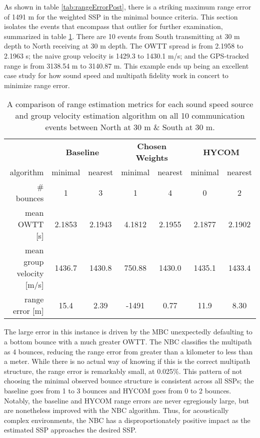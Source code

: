 As shown in table \ref{tab:rangeErrorPost}, there is a striking maximum range error of 1491 m for the weighted SSP in the minimal bounce criteria.
This section isolates the events that encompass that outlier for further examination, summarized in table \ref{tab:rangeErrorPostExplanation}.
There are 10 events from South transmitting at 30 m depth to North receiving at 30 m depth.
The OWTT spread is from 2.1958 to 2.1963 s; the naive group velocity is 1429.3 to 1430.1 m/s; and the GPS-tracked range is from 3138.54 m to 3140.87 m.
This example ends up being an excellent case study for how sound speed and multipath fidelity work in concert to minimize range error.

\begin{table}[h!]
\renewcommand{\arraystretch}{1.5}
\centering
\begin{tabular}{r|cc|cc|cc}\toprule
 & \multicolumn{2}{c|}{\textbf{Baseline} } & \multicolumn{2}{c|}{\textbf{Chosen Weights} } & \multicolumn{2}{c}{\textbf{HYCOM}} \\
 algorithm & \cellcolor[HTML]{EFEFEF}minimal & nearest & \cellcolor[HTML]{EFEFEF} minimal& nearest & \cellcolor[HTML]{EFEFEF}minimal & nearest \\ \hline
 \# bounces 				& \cellcolor[HTML]{EFEFEF}1 		& 3 		& \cellcolor[HTML]{EFEFEF}1 		& 4 		& \cellcolor[HTML]{EFEFEF}0 	 & 2 \\
 mean OWTT [s] 				& \cellcolor[HTML]{EFEFEF}2.1853 	& 2.1943 	& \cellcolor[HTML]{EFEFEF}4.1812 	& 2.1955 	& \cellcolor[HTML]{EFEFEF}2.1877 & 2.1902 \\
 mean group velocity [m/s] 	& \cellcolor[HTML]{EFEFEF}1436.7 	& 1430.8 	& \cellcolor[HTML]{EFEFEF}750.88 	& 1430.0 	& \cellcolor[HTML]{EFEFEF}1435.1 & 1433.4 \\
 range error [m] 			& \cellcolor[HTML]{EFEFEF}15.4 		& 2.39 	 	& \cellcolor[HTML]{EFEFEF}-1491 	& 0.77 		& \cellcolor[HTML]{EFEFEF}11.9 & 8.30 \\
 \toprule
\end{tabular}
\caption[Further look at algorithm differences for one beacon to beacon pairing]{A comparison of range estimation metrics for each sound speed source and group velocity estimation algorithm on all 10 communication events between North at 30 m \& South at 30 m.}
\label{tab:rangeErrorPostExplanation}
\end{table}

The large error in this instance is driven by the MBC unexpectedly defaulting to a bottom bounce with a much greater OWTT.
The NBC classifies the multipath as 4 bounces, reducing the range error from greater than a kilometer to less than a meter.
While there is no actual way of knowing if this is the correct multipath structure, the range error is remarkably small, at 0.025\%. 
This pattern of not choosing the minimal observed bounce structure is consistent across all SSPs; the baseline goes from 1 to 3 bounces and HYCOM goes from 0 to 2 bounces.
Notably, the baseline and HYCOM range errors are never egregiously large, but are nonetheless improved with the NBC algorithm.
Thus, for acoustically complex environments, the NBC has a disproportionately positive impact as the estimated SSP approaches the desired SSP.

